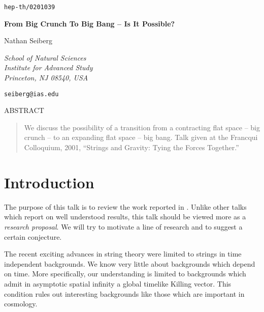 \documentclass[a4paper,12pt,oneside]{article}
\begin{document}
\thispagestyle{empty}
\setcounter{page}{0}
\renewcommand{\theequation}{\thesection.\arabic{equation}}

{\hfill{\tt hep-th/0201039}}

\vspace{2cm}

\begin{center}
{\bf From Big Crunch To Big Bang -- Is It Possible?}

\vspace{1.4cm}

Nathan Seiberg

\vspace{.2cm}

{\em School of Natural Sciences} \\
{\em Institute for Advanced Study} \\
{\em Princeton, NJ 08540, USA} \\
\end{center}

\vspace{-.1cm}

\centerline{{\tt seiberg@ias.edu}}

\vspace{1cm}

\centerline{ABSTRACT}

\vspace{- 4 mm}

\begin{quote}\small
We discuss the possibility of a transition from a contracting
flat space -- big crunch -- to an expanding flat space -- big
bang.  Talk given at the Francqui Colloquium, 2001, ``Strings and
Gravity: Tying the Forces Together.''

\end{quote}

\baselineskip18pt

\newpage

\setcounter{equation}{0}
\section{Introduction}

The purpose of this talk is to review the work reported in
\cite{KOSST}.  Unlike other talks which report on well understood
results, this talk should be viewed more as a {\it research
proposal}.  We will try to motivate a line of research and to
suggest a certain conjecture.

The recent exciting advances in string theory were limited to
strings in time independent backgrounds.  We know very little
about backgrounds which depend on time.  More specifically, our
understanding is limited to backgrounds which admit in asymptotic
spatial infinity a global timelike Killing vector.  This
condition rules out interesting backgrounds like those which are
important in cosmology.
\end{document}
